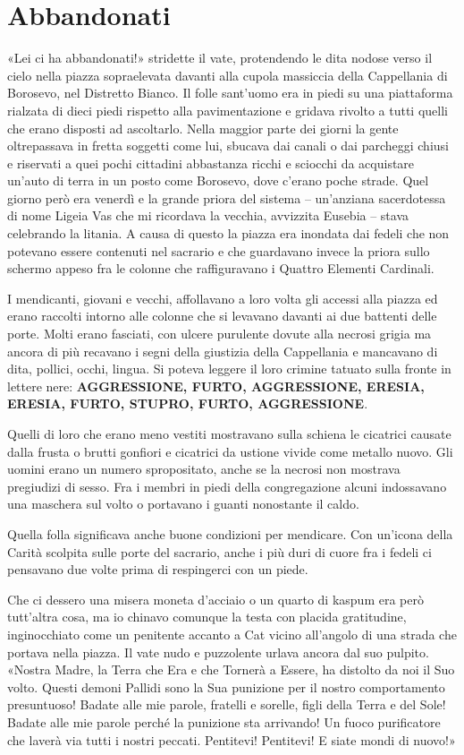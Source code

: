\chapter{Abbandonati}

«Lei ci ha abbandonati!» stridette il vate, protendendo le dita nodose
verso il cielo nella piazza sopraelevata davanti alla cupola massiccia
della Cappellania di Borosevo, nel Distretto Bianco. Il folle sant'uomo
era in piedi su una piattaforma rialzata di dieci piedi rispetto alla
pavimentazione e gridava rivolto a tutti quelli che erano disposti ad
ascoltarlo. Nella maggior parte dei giorni la gente oltrepassava in
fretta soggetti come lui, sbucava dai canali o dai parcheggi chiusi e
riservati a quei pochi cittadini abbastanza ricchi e sciocchi da
acquistare un'auto di terra in un posto come Borosevo, dove c'erano
poche strade. Quel giorno però era venerdì e la grande priora del
sistema -- un'anziana sacerdotessa di nome Ligeia Vas che mi ricordava
la vecchia, avvizzita Eusebia -- stava celebrando la litania. A causa di
questo la piazza era inondata dai fedeli che non potevano essere
contenuti nel sacrario e che guardavano invece la priora sullo schermo
appeso fra le colonne che raffiguravano i Quattro Elementi Cardinali.

I mendicanti, giovani e vecchi, affollavano a loro volta gli accessi
alla piazza ed erano raccolti intorno alle colonne che si levavano
davanti ai due battenti delle porte. Molti erano fasciati, con ulcere
purulente dovute alla necrosi grigia ma ancora di più recavano i segni
della giustizia della Cappellania e mancavano di dita, pollici, occhi,
lingua. Si poteva leggere il loro crimine tatuato sulla fronte in
lettere nere: \textbf{AGGRESSIONE, FURTO, AGGRESSIONE, ERESIA, ERESIA, FURTO, STUPRO, FURTO, AGGRESSIONE}.

Quelli di loro che erano meno vestiti mostravano sulla schiena le cicatrici causate dalla
frusta o brutti gonfiori e cicatrici da ustione vivide come metallo
nuovo. Gli uomini erano un numero spropositato, anche se la necrosi non
mostrava pregiudizi di sesso. Fra i membri in piedi della congregazione
alcuni indossavano una maschera sul volto o portavano i guanti
nonostante il caldo.

Quella folla significava anche buone condizioni per mendicare. Con
un'icona della Carità scolpita sulle porte del sacrario, anche i più
duri di cuore fra i fedeli ci pensavano due volte prima di respingerci
con un piede.

Che ci dessero una misera moneta d'acciaio o un quarto di kaspum era
però tutt'altra cosa, ma io chinavo comunque la testa con placida
gratitudine, inginocchiato come un penitente accanto a Cat vicino
all'angolo di una strada che portava nella piazza. Il vate nudo e
puzzolente urlava ancora dal suo pulpito. «Nostra Madre, la Terra che
Era e che Tornerà a Essere, ha distolto da noi il Suo volto. Questi
demoni Pallidi sono la Sua punizione per il nostro comportamento
presuntuoso! Badate alle mie parole, fratelli e sorelle, figli della
Terra e del Sole! Badate alle mie parole perché la punizione sta
arrivando! Un fuoco purificatore che laverà via tutti i nostri peccati.
Pentitevi! Pentitevi! E siate mondi di nuovo!»

